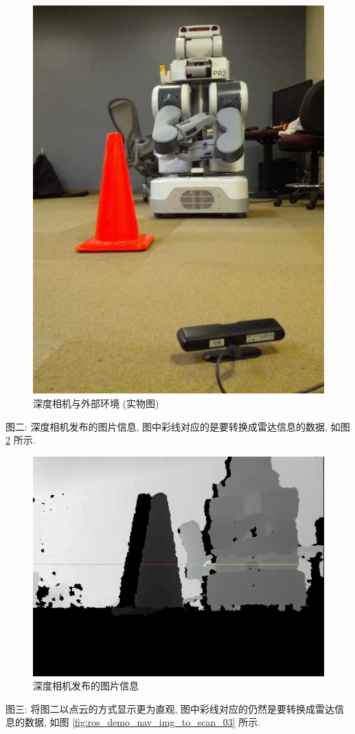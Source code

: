 \documentclass[openany, fontset=windowsold]{ctexbook}
\theoremstyle{kaiti}
\theoremstyle{normal}
\begin{document}
\begin{figure}[!ht]
  \centering
  \includegraphics[width=.5\textwidth]{ros_demo_nav_img_to_scan_01.jpg}
  \caption{深度相机与外部环境 (实物图)}
  \label{fig:ros_demo_nav_img_to_scan_01}
\end{figure}

图二: 深度相机发布的图片信息, 图中彩线对应的是要转换成雷达信息的数据, 如图 \ref{fig:ros_demo_nav_img_to_scan_02} 所示.

\begin{figure}[!ht]
  \centering
  \includegraphics[width=.8\textwidth]{ros_demo_nav_img_to_scan_02.png}
  \caption{深度相机发布的图片信息}
  \label{fig:ros_demo_nav_img_to_scan_02}
\end{figure}

图三: 将图二以点云的方式显示更为直观, 图中彩线对应的仍然是要转换成雷达信息的数据, 如图 \ref{fig:ros_demo_nav_img_to_scan_03} 所示.
\end{document}
